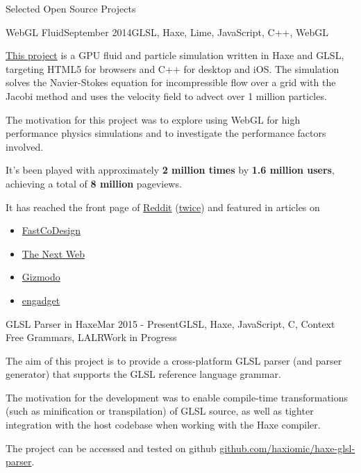 \documentclass{resume} %
\begin{document}

\begin{rSection}{Selected Open Source Projects}

\begin{rSubsection}{WebGL Fluid}{September 2014}{GLSL, Haxe, Lime, JavaScript, C++, WebGL}{}
\item \href{https://github.com/haxiomic/GPU-Fluid-Experiments}{This project} is a GPU fluid and particle simulation written in Haxe and GLSL, targeting HTML5 for browsers and C++ for desktop and iOS. The simulation solves the Navier-Stokes equation for incompressible flow over a grid with the Jacobi method and uses the velocity field to advect over 1 million particles.
\item The motivation for this project was to explore using WebGL for high performance physics simulations and to investigate the performance factors involved.
\item It's been played with approximately \textbf{2 million times} by \textbf{1.6 million users}, achieving a total of \textbf{8 million} pageviews.
\item It has reached the front page of \href{https://www.reddit.com/r/InternetIsBeautiful/comments/2gkunq/fluid_and_particles_in_webgl/}{Reddit} (\href{https://www.reddit.com/r/InternetIsBeautiful/comments/35s6hg/in_browser_physics_simulator_xpost_pc_master_race/}{twice}) and featured in articles on
\begin{itemize}
	\item \href{http://www.fastcodesign.com/3038725/this-wonderful-web-toy-turns-your-browser-into-magic-liquid}{FastCoDesign}
	\item \href{http://thenextweb.com/creativity/2015/05/15/webgl-fluid-experiment-is-a-browser-based-lsd-trip/}{The Next Web}
	\item \href{http://www.gizmodo.co.uk/2014/11/just-try-and-stop-playing-with-this-fluid-simulator/}{Gizmodo}
	\item \href{http://www.engadget.com/2015/05/15/GPU-physics-trippy-simulation/}{engadget}
\end{itemize}
\end{rSubsection}

\begin{rSubsection}{GLSL Parser in Haxe}{Mar 2015 - Present}{GLSL, Haxe, JavaScript, C, Context Free Grammars, LALR}{Work in Progress}
\item The aim of this project is to provide a cross-platform GLSL parser (and parser generator) that supports the GLSL reference language grammar.
\item The motivation for the development was to enable compile-time transformations (such as minification or transpilation) of GLSL source, as well as tighter integration with the host codebase when working with the Haxe compiler.
\item The project can be accessed and tested on github \href{https://github.com/haxiomic/haxe-glsl-parser}{github.com/haxiomic/haxe-glsl-parser}.
\end{rSubsection}
	

\end{rSection}
\end{document}
